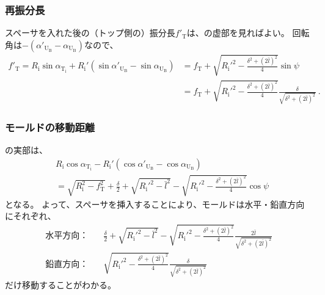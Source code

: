 \subsubsection{再振分長}
スペーサを入れた後の（トップ側の）振分長$f'_\mathrm T$は、の虚部を見ればよい。
回転角は$-(\alpha'_{\mathrm U_\mathrm B}-\alpha_{\mathrm U_\mathrm B})$なので、
\begin{align*}
  f'_\mathrm T
  = R_\mathrm i\sin\alpha_{\mathrm T_\mathrm i}
    +R_\mathrm i'\left(\sin\alpha'_{\mathrm U_\mathrm B}-\sin\alpha_{\mathrm U_\mathrm B}\right)
  &= f_\mathrm T+\sqrt{R_\mathrm i'^2-\frac{\delta^2+(2\bar l)^2}4}\sin\psi\\
  &= f_\mathrm T+\sqrt{R_\mathrm i'^2-\frac{\delta^2+(2\bar l)^2}4}\frac\delta{\sqrt{\delta^2+(2\bar l)^2}}\ .
\end{align*}


\subsubsection{モールドの移動距離}
の実部は、
\begin{align*}
  & R_\mathrm i\cos\alpha_{\mathrm T_\mathrm i}
    -R_\mathrm i'(\cos\alpha'_{\mathrm U_\mathrm B}-\cos\alpha_{\mathrm U_\mathrm B})\\
  & = \sqrt{R_\mathrm i^2-f_\mathrm T^2}+\frac\delta2+\sqrt{R_\mathrm i'^2-\bar l^2}
      -\sqrt{R_\mathrm i'^2-\frac{\delta^2+(2\bar l)^2}4}\cos\psi
\end{align*}
となる。
よって、スペーサを挿入することにより、モールドは水平・鉛直方向にそれぞれ、
\begin{subequations}
\begin{alignat}{2}
  \label{eq:spacerMoveHdistance}
  \text{水平方向：}\quad
  & \frac\delta2+\sqrt{R_\mathrm i'^2-\bar l^2}-\sqrt{R_\mathrm i'^2-\frac{\delta^2+(2\bar l)^2}4}\frac{2\bar l}{\sqrt{\delta^2+(2\bar l)^2}}\\
  \text{鉛直方向：}\quad
  & \sqrt{R_\mathrm i'^2-\frac{\delta^2+(2\bar l)^2}4}\frac\delta{\sqrt{\delta^2+(2\bar l)^2}}
\end{alignat}
\end{subequations}
だけ移動することがわかる。



